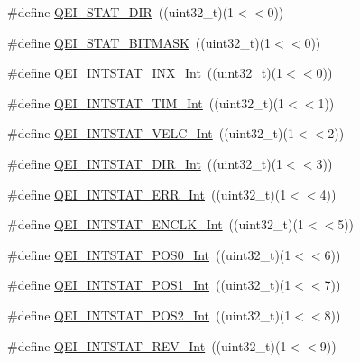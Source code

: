 \begin{DoxyCompactItemize}
\item 
\#define \hyperlink{group___q_e_i___private___macros_gaae76578f42bda5774a39bb774fcf4fbf}{\-Q\-E\-I\-\_\-\-S\-T\-A\-T\-\_\-\-D\-I\-R}~((uint32\-\_\-t)(1$<$$<$0))
\item 
\#define \hyperlink{group___q_e_i___private___macros_ga1ab9a99635f383ad2a3635088a7027cc}{\-Q\-E\-I\-\_\-\-S\-T\-A\-T\-\_\-\-B\-I\-T\-M\-A\-S\-K}~((uint32\-\_\-t)(1$<$$<$0))
\item 
\#define \hyperlink{group___q_e_i___private___macros_gaea897986e188ae7c379f3a5aac42cfe3}{\-Q\-E\-I\-\_\-\-I\-N\-T\-S\-T\-A\-T\-\_\-\-I\-N\-X\-\_\-\-Int}~((uint32\-\_\-t)(1$<$$<$0))
\item 
\#define \hyperlink{group___q_e_i___private___macros_gab4188cd3d0d9e76a753a82b6b2e44274}{\-Q\-E\-I\-\_\-\-I\-N\-T\-S\-T\-A\-T\-\_\-\-T\-I\-M\-\_\-\-Int}~((uint32\-\_\-t)(1$<$$<$1))
\item 
\#define \hyperlink{group___q_e_i___private___macros_ga12c00ccf1cf4ae28ffa78f2f34ea1982}{\-Q\-E\-I\-\_\-\-I\-N\-T\-S\-T\-A\-T\-\_\-\-V\-E\-L\-C\-\_\-\-Int}~((uint32\-\_\-t)(1$<$$<$2))
\item 
\#define \hyperlink{group___q_e_i___private___macros_ga233b0fc7e81b87ed9345d3788935b4fd}{\-Q\-E\-I\-\_\-\-I\-N\-T\-S\-T\-A\-T\-\_\-\-D\-I\-R\-\_\-\-Int}~((uint32\-\_\-t)(1$<$$<$3))
\item 
\#define \hyperlink{group___q_e_i___private___macros_gafc3dab21c61a8f409fe0cafd63e1d917}{\-Q\-E\-I\-\_\-\-I\-N\-T\-S\-T\-A\-T\-\_\-\-E\-R\-R\-\_\-\-Int}~((uint32\-\_\-t)(1$<$$<$4))
\item 
\#define \hyperlink{group___q_e_i___private___macros_ga43ad79ac060e263fc25fbf66055bf50b}{\-Q\-E\-I\-\_\-\-I\-N\-T\-S\-T\-A\-T\-\_\-\-E\-N\-C\-L\-K\-\_\-\-Int}~((uint32\-\_\-t)(1$<$$<$5))
\item 
\#define \hyperlink{group___q_e_i___private___macros_ga2d8a45ff072d2a26c97acce3149e6dc5}{\-Q\-E\-I\-\_\-\-I\-N\-T\-S\-T\-A\-T\-\_\-\-P\-O\-S0\-\_\-\-Int}~((uint32\-\_\-t)(1$<$$<$6))
\item 
\#define \hyperlink{group___q_e_i___private___macros_ga637dc38b5288e83e06df77fd151d05e0}{\-Q\-E\-I\-\_\-\-I\-N\-T\-S\-T\-A\-T\-\_\-\-P\-O\-S1\-\_\-\-Int}~((uint32\-\_\-t)(1$<$$<$7))
\item 
\#define \hyperlink{group___q_e_i___private___macros_ga23d3ab22b2318f6728a34d77a52957e7}{\-Q\-E\-I\-\_\-\-I\-N\-T\-S\-T\-A\-T\-\_\-\-P\-O\-S2\-\_\-\-Int}~((uint32\-\_\-t)(1$<$$<$8))
\item 
\#define \hyperlink{group___q_e_i___private___macros_ga6d6d1b319f14cc3fcfc120a5d122b71a}{\-Q\-E\-I\-\_\-\-I\-N\-T\-S\-T\-A\-T\-\_\-\-R\-E\-V\-\_\-\-Int}~((uint32\-\_\-t)(1$<$$<$9))

\end{DoxyCompactItemize}
